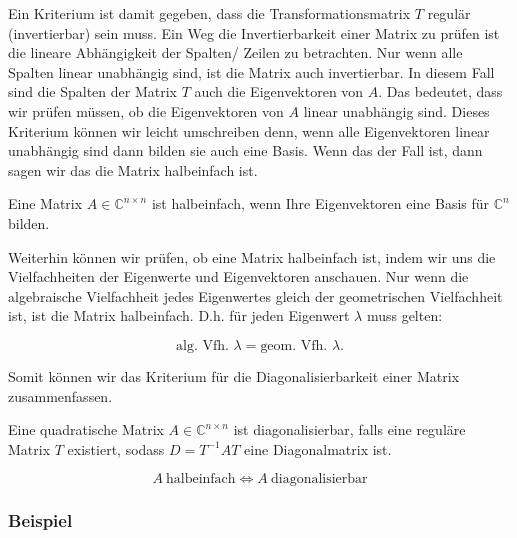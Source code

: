 Ein Kriterium ist damit gegeben, dass die Transformationsmatrix \( T \) regulär (invertierbar) sein muss. Ein Weg die Invertierbarkeit einer Matrix zu prüfen ist die lineare Abhängigkeit der Spalten/ Zeilen zu betrachten. Nur wenn alle Spalten linear unabhängig sind, ist die Matrix auch invertierbar. In diesem Fall sind die Spalten der Matrix \( T \) auch die Eigenvektoren von \( A \). Das bedeutet, dass wir prüfen müssen, ob die Eigenvektoren von \( A \) linear unabhängig sind. Dieses Kriterium können wir leicht umschreiben denn, wenn alle Eigenvektoren linear unabhängig sind dann bilden sie auch eine Basis. Wenn das der Fall ist, dann sagen wir das die Matrix halbeinfach ist. 

\begin{tcolorbox}[colback=gray!30, colframe=gray!80, title=Halbeinfache Matrizen]
    Eine Matrix \( A \in \mathbb{C}^{n \times n} \) ist halbeinfach, wenn Ihre Eigenvektoren eine Basis für \( \mathbb{C}^n \) bilden. 
\end{tcolorbox}

Weiterhin können wir prüfen, ob eine Matrix halbeinfach ist, indem wir uns die Vielfachheiten der Eigenwerte und Eigenvektoren anschauen. Nur wenn die algebraische Vielfachheit jedes Eigenwertes gleich der geometrischen Vielfachheit ist, ist die Matrix halbeinfach. D.h. für jeden Eigenwert \( \lambda \) muss gelten:

\begin{equation*}
    \text{alg. Vfh. } \lambda = \text{geom. Vfh. } \lambda.
\end{equation*}

Somit können wir das Kriterium für die Diagonalisierbarkeit einer Matrix zusammenfassen.

\begin{tcolorbox}[colback=gray!30, colframe=gray!80, title=Halbeinfache Matrizen]
    Eine quadratische Matrix \( A \in \mathbb{C}^{n \times n} \) ist diagonalisierbar, falls eine reguläre Matrix \( T \) existiert, sodass \( D = T^{-1} A T \) eine Diagonalmatrix ist. 

    \begin{equation*}
        A \ \text{halbeinfach} \Leftrightarrow A \ \text{diagonalisierbar}
    \end{equation*}
\end{tcolorbox}

\subsubsection*{Beispiel} \( \ \)

